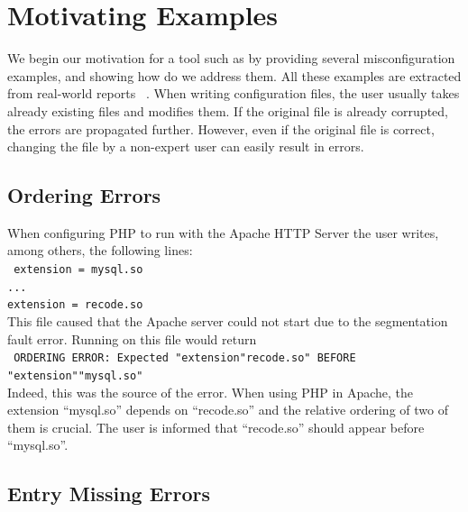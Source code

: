 \section{Motivating Examples}
\label{sec:motiv}

We begin our motivation for a tool such as \app by providing several misconfiguration examples, and showing how do we address them. All these examples are extracted from real-world reports%
~\cite{yin11anempirical, configdataset}. When writing configuration files, the user usually takes already existing files and modifies them. If the original file is already corrupted, the errors are propagated further. However, even if the original file is correct, changing the file by a non-expert user can easily result in errors.


\subsection{Ordering Errors}

When configuring PHP to run with the Apache HTTP Server the user writes, among others, the following lines:\\
 \texttt{
 \hspace*{3em}extension = mysql.so\\
 \hspace*{3em}...\\
 \hspace*{3em}extension = recode.so}\\
This file caused that the Apache server could not start due to 
the segmentation fault error. Running \app on this file would return\\
 \texttt{
ORDERING ERROR: Expected "extension"recode.so" BEFORE "extension""mysql.so"
  }\\
Indeed, this was the source of the error. When using PHP in Apache, the
extension ``mysql.so'' depends on ``recode.so'' and the relative ordering 
of two of them is crucial. The user is informed that ``recode.so'' should appear before ``mysql.so''.

\subsection{Entry Missing Errors}

